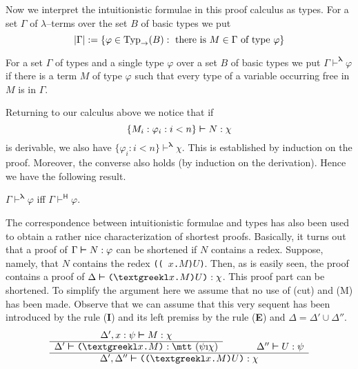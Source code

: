 Now we interpret the intuitionistic formulae in this proof calculus
as types. For a set $\Gamma$ of $\lambda$--terms over the set $B$
of basic types we put
\begin{equation}
|\Gamma| := \{\varphi \in \operatorname{Typ}_{\rightarrow}(B) :
    \mbox{ there is } M \in \Gamma \mbox{ of type } \varphi\}
\end{equation}
\begin{defn}
For a set $\Gamma$ of types and a single type $\varphi$ over a set $B$ 
of basic types we put $\Gamma \vdash^{\boldsymbol{\lambda}} \varphi$ if 
there is a term $M$ of type $\varphi$ such that every type of a variable 
occurring free in $M$ is in $\Gamma$.
\end{defn}
Returning to our calculus above we notice that if
\begin{equation}
\{M_i : \varphi_i : i < n\} \boldsymbol{\vdash} N : \chi
\end{equation}
is derivable, we also have 
$\{\varphi_i : i < n\} \vdash^{\boldsymbol{\lambda}}
\chi$. This is established by induction on the proof.
Moreover, the converse also holds (by induction on the
derivation). Hence we have the following result.
\begin{thm}[Curry]
$\Gamma \vdash^{\boldsymbol{\lambda}} \varphi$ iff 
$\Gamma \vdash^{\mathsf{H}} \varphi$.
\end{thm}
The correspondence between intuitionistic formulae and types has
also been used to obtain a rather nice characterization of
shortest proofs. Basically, it turns out that a proof of $\Gamma
\boldsymbol{\vdash} N : \varphi$ can be shortened if $N$ contains a redex.
Suppose, namely, that $N$ contains the redex {\tt ((\stlambda
$x$.$M$)$U$)}. Then, as is easily seen, the proof
contains a proof of $\Delta \bvdash \mbox{\tt (\stlambda$x$.$M$%
)$U$)} : \chi$. This proof part can be shortened. To
simplify the argument here we assume that no use of (cut) and (M)
has been made. Observe that we can assume that this very sequent
has been introduced by the rule (\textbf{I}{\mtt{}}) and 
its left premiss by the rule (\textbf{E}{\mtt{}}) and 
$\Delta = \Delta' \cup \Delta''$.  
\begin{equation}
\begin{array}{ccc}
\Delta', x : \psi \bvdash M : \chi & \qquad & \\\cline{1-1}
\Delta' \bvdash \mbox{\tt (\stlambda$x$.$M$)} :
    \mbox{\mtt ($\psi$\symbol{25}$\chi$)} & & \Delta'' 
	\bvdash U : \psi \\\hline
\multicolumn{3}{c}{%
\Delta', \Delta'' \bvdash \mbox{\tt ((\stlambda$x$.$M$)$U$)} : \chi}
\end{array}
\end{equation}
